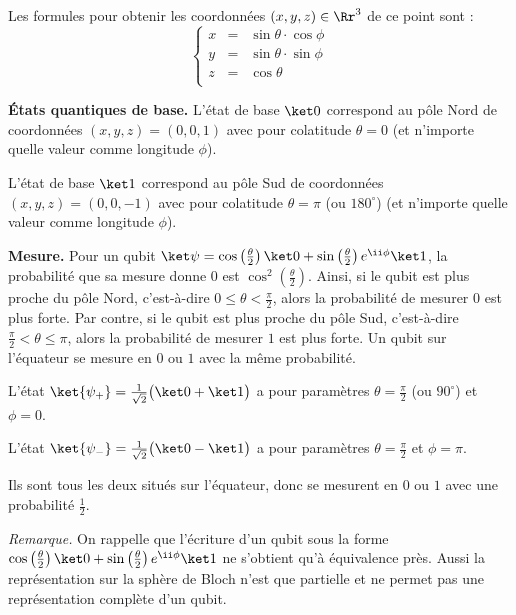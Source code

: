\documentclass[11pt,class=report,crop=false]{standalone}
\renewcommand{\commentfigure}[1]{#1} %
\begin{document}
Les formules pour obtenir les coordonnées $(x,y,z)\in\Rr^3$ de ce point sont :
$$\left\{\begin{array}{rcl}
x &=& \sin\theta \cdot \cos\phi \\
y &=& \sin\theta \cdot \sin\phi \\
z &=& \cos\theta \\
\end{array}\right.$$


\bigskip
\textbf{États quantiques de base.}
L'état de base $\ket0$ correspond au pôle Nord de coordonnées $(x,y,z)= (0,0,1)$ avec pour colatitude $\theta=0$ (et n'importe quelle valeur comme longitude $\phi$).
\commentfigure{ 
\myfigure{0.8}{
\tikzinput{bloch02a}\qquad\qquad
\tikzinput{bloch02b}
}  
}
L'état de base $\ket1$ correspond au pôle Sud de coordonnées $(x,y,z)= (0,0,-1)$ avec pour colatitude $\theta=\pi$ (ou $180^\circ$) (et n'importe quelle valeur comme longitude $\phi$).
 
\bigskip
\textbf{Mesure.}
Pour un qubit $\ket\psi = \cos\left(\frac\theta2\right)\ket0+ \sin\left(\frac\theta2\right)e^{\ii\phi}\ket1$, la probabilité que sa mesure donne $0$ est
$\cos^2(\frac\theta2)$. 
Ainsi, si le qubit est plus proche du pôle Nord, c'est-à-dire $0 \le \theta < \frac\pi2$, alors la probabilité de mesurer $0$ est plus forte.
Par contre, si le qubit est plus proche du pôle Sud, c'est-à-dire $\frac\pi2 < \theta \le  \pi$, alors la probabilité de mesurer $1$ est plus forte.
Un qubit sur l'équateur se mesure en $0$ ou $1$ avec la même probabilité.



\begin{exemple}
L'état $\ket{\psi_+} = \frac1{\sqrt2} \big(\ket0+\ket1\big)$ a pour paramètres
$\theta = \frac\pi2$ (ou $90^\circ$) et $\phi=0$. 
  
  
  L'état $\ket{\psi_-} = \frac1{\sqrt2} \big(\ket0-\ket1\big)$ a pour paramètres
   $\theta = \frac\pi2$ et $\phi=\pi$.
    
   \commentfigure{
   }
Ils sont tous les deux situés sur l'équateur, donc se mesurent en $0$ ou $1$ avec une probabilité $\frac12$.
\end{exemple}


\emph{Remarque.} On rappelle que l'écriture d'un qubit sous la forme $ \cos\left(\frac\theta2\right)\ket0+ \sin\left(\frac\theta2\right)e^{\ii\phi}\ket1$ ne s'obtient qu'à équivalence près. Aussi la représentation sur la sphère de Bloch n'est que partielle et ne permet pas une représentation complète d'un qubit.
\end{document}
